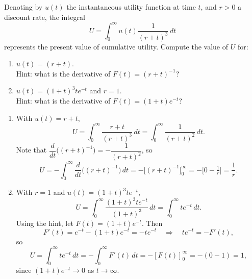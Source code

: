 \documentclass[11pt]{exam}
\begin{document}
\begin{questions}
\question[2]
    Denoting by \( u(t) \) the instantaneous utility function at time $t$, and \( r > 0 \) a discount rate, the integral
    \[
    U = \int_{0}^{\infty} u(t) \frac{1}{(r+t)^3} \, dt
    \]
    represents the present value of cumulative utility. Compute the value of $U$ for:
    
    \begin{enumerate}[leftmargin = 0.5cm, label = (\alph*), rightmargin = 0.2cm]

        \item $u(t) = (r + t)$.\\
        Hint: what is the derivative of $F(t) = (r + t)^{-1}$?
        
        \item $u(t) = (1 + t)^3te^{-t}$ and $r = 1$.\\
        Hint: what is the derivative of $F(t) = \left(1 + t\right)e^{-t}$?
        
    \end{enumerate}

\begin{solution}
    \begin{enumerate}[leftmargin=0.55cm, label=(\alph*), rightmargin=0.2cm]
        
        \item With $u(t) = r + t$,
        \[
            U = \int_0^\infty \frac{r+t}{(r+t)^3}\,dt
              = \int_0^\infty \frac{1}{(r+t)^2}\,dt.
        \]
        Note that $\dfrac{d}{dt}\big((r+t)^{-1}\big) = -\dfrac{1}{(r+t)^2}$, so
        \[
            U = -\int_0^\infty \frac{d}{dt}\big((r+t)^{-1}\big)\,dt
              = -\big[(r+t)^{-1}\big]_0^\infty
              = -\big[0 - \tfrac{1}{r}\big]
              = \frac{1}{r}.
        \]

        \item With $r = 1$ and $u(t) = (1+t)^3 t e^{-t}$,
        \[
            U = \int_0^\infty \frac{(1+t)^3 t e^{-t}}{(1+t)^3}\,dt
              = \int_0^\infty t e^{-t}\,dt.
        \]
        Using the hint, let $F(t) = (1+t)e^{-t}$. Then
        \[
            F'(t) = e^{-t} - (1+t)e^{-t} = -t e^{-t}
            \quad\Rightarrow\quad t e^{-t} = -F'(t),
        \]
        so
        \[
            U = \int_0^\infty t e^{-t}\,dt
              = -\int_0^\infty F'(t)\,dt
              = -[F(t)]_0^\infty
              = -(0 - 1) = 1,
        \]
        since $(1+t)e^{-t} \to 0$ as $t\to\infty$.

    \end{enumerate}
\end{solution}




\end{questions}	
\end{document}
